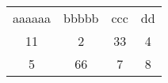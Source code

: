 \begin{tabular}{cccc}
	aaaaaa & bbbbb & ccc & dd \\
	11 & 2  & 33 & 4          \\
	5  & 66 & 7  & 8
\end{tabular}

